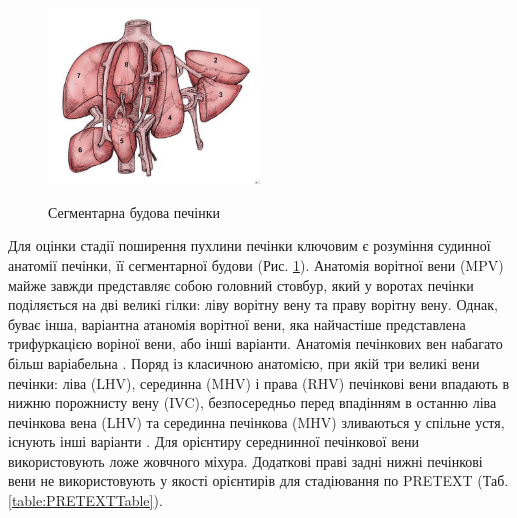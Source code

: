 \begin{figure}[h]
\centering
\includegraphics[width=0.5\textwidth]{Illustrations/segment.jpg}
\label{fig:segment} %
\caption{Сегментарна будова печінки}
\end{figure}

Для оцінки стадії поширення пухлини печінки ключовим є розуміння судинної анатомії печінки, її сегментарної будови  (Рис. \ref{fig:segment}). 
Анатомія ворітної вени (MPV) майже завжди представляє собою головний стовбур, який у воротах печінки поділяється на дві великі гілки: ліву ворітну вену та праву ворітну вену. Однак, буває інша, варіантна атаномія ворітної вени, яка найчастіше представлена трифуркацією воріної вени, або інші варіанти.
Анатомія печінкових вен набагато більш варіабельна \cite{pmid22813792}. Поряд із класичною анатомією, при якій три великі вени печінки: ліва (LHV), серединна (MHV) і права (RHV) печінкові вени впадають в нижню порожнисту вену (IVC), безпосередньо перед впадінням в останню ліва печінкова вена (LHV) та серединна печінкова (MHV) зливаються у спільне устя, існують інші варіанти \cite{pmid22835780}. 
Для орієнтиру середнинної печінкової вени використовують ложе жовчного міхура. Додаткові праві задні нижні печінкові вени не використовують у якості орієнтирів для стадіювання по PRETEXT (Таб. \ref{table:PRETEXTTable}).

\begin{table}[]
\caption{Cтадіювання гепатобластом по PRETEXT.}
\label{table:PRETEXTTable}
\end{table}

